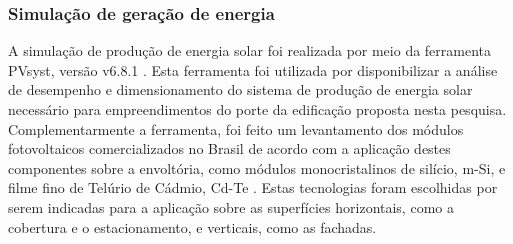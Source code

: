 \subsubsection{Simulação de geração de energia}
\noindent A simulação de produção de energia solar foi realizada por meio da ferramenta PVsyst, versão v6.8.1 \cite{Cronemberger2012}. Esta ferramenta foi utilizada por disponibilizar a análise de desempenho e dimensionamento do sistema de produção de energia solar necessário para empreendimentos do porte da edificação proposta nesta pesquisa. Complementarmente a ferramenta, foi feito um levantamento dos módulos fotovoltaicos comercializados no Brasil de acordo com a aplicação destes componentes sobre a envoltória, como módulos monocristalinos de silício, m-Si, e filme fino de Telúrio de Cádmio, Cd-Te \cite{Didone2014,Werneck2017,Sorgato2018}. Estas tecnologias foram escolhidas por serem indicadas para a aplicação sobre as superfícies horizontais, como a cobertura e o estacionamento, e verticais, como as fachadas.\newline
